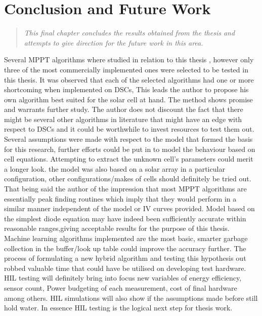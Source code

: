 \chapter{Conclusion and Future Work}
\begin{quote} 
\it This final chapter concludes the results obtained from the thesis and attempts to give direction for the future work in this area.
\end{quote}

Several \ac{MPPT} algorithms where studied in relation to this thesis , however only three of the most commercially implemented ones were selected to be tested in this thesis. It was observed that each of the selected algorithms had one or more shortcoming when implemented on \ac{DSCs}, This leads the author to propose his own algorithm best suited for the solar cell at hand. The method shows promise and warrants further study. The author does not discount the fact that there might be several other algorithms in literature that might have an edge with respect to \ac{DSCs} and it could be worthwhile to invest resources to test them out.\\

Several assumptions were made with respect to the model that formed the basis for this research, further efforts could be put in to model the behaviour based on cell equations. Attempting to extract the unknown cell's parameters could merit a longer look. the model was also based on a solar array in a particular configuration, other configurations/makes of cells should definitely be tried out. That being said the author of the impression that most \ac{MPPT} algorithms are essentially peak finding routines which imply that they would perform in a similar manner independent of the model or IV curves provided. Model based on the simplest diode equation may have indeed been sufficiently accurate within reasonable ranges,giving acceptable results for the purpose of this thesis.\\

Machine learning algorithms implemented are the most basic, smarter garbage collection in the buffer/look up table could improve the accuracy further. The process of formulating a new hybrid algorithm and testing this hypothesis out robbed valuable time that could have be utilised on developing test hardware. \ac{HIL} testing will definitely bring into focus new variables of energy efficiency, sensor count, Power budgeting of each measurement, cost of final hardware among others. \ac{HIL} simulations will also show if the assumptions made before still hold water. In essence \ac{HIL} testing is the logical next step for thesis work.\\

